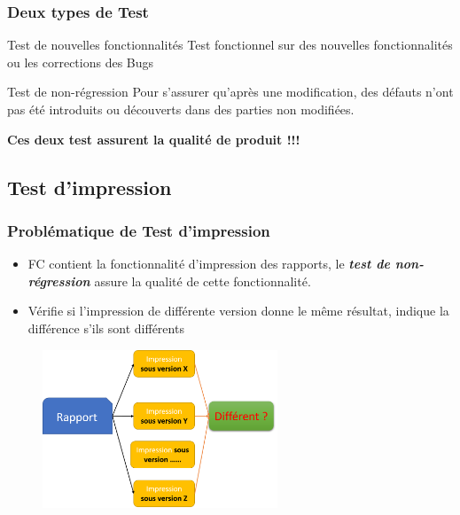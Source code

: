 \documentclass{beamer}
\begin{document}
        
        
        \begin{frame}[t]
            \frametitle{Deux types de Test}
            \begin{block}{Test de nouvelles fonctionnalités}
                Test fonctionnel sur des nouvelles fonctionnalités ou les corrections des Bugs
            \end{block}
            
            \begin{block}{Test de non-régression}
            Pour s'assurer qu'après une modification, des défauts n'ont pas été introduits ou découverts dans des parties non modifiées.
            \end{block}
            \pause
            
            \centering
            \alert{{\Large{\textbf{Ces deux test assurent la qualité de produit !!!}}}}
        \end{frame}
        
        \subsection{Test d'impression}
        
        \begin{frame}
            \frametitle{Problématique de Test d'impression}
            \begin{itemize}
                \item FC contient la fonctionnalité d'impression des rapports,  le \textit{\textbf{test de non-régression}} assure la qualité de cette fonctionnalité.
                \pause
                \item Vérifie si l'impression de différente version donne le même résultat, indique la différence s'ils sont différents
            \end{itemize}
             
            \begin{figure}[H]
                \centering
                \includegraphics[width=7cm]{problematique_print.png}
                \label{fig:problem_print}
            \end{figure}
                
        \end{frame}
        
\end{document}
